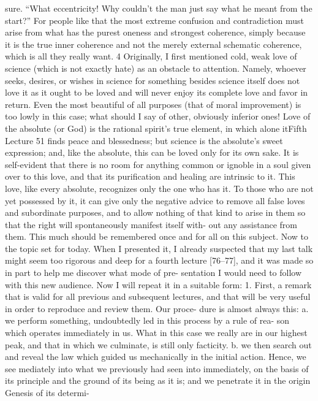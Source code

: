 sure. “What eccentricity! Why couldn’t the man just say what he meant from
the start?” For people like that the most extreme confusion and contradiction
must arise from what has the purest oneness and strongest coherence, simply
because it is the true inner coherence and not the merely external schematic
coherence, which is all they really want. 4
Originally, I first mentioned cold, weak love of science (which is not
exactly hate) as an obstacle to attention. Namely, whoever seeks, desires, or
wishes in science for something besides science itself does not love it as it
ought to be loved and will never enjoy its complete love and favor in return.
Even the most beautiful of all purposes (that of moral improvement) is too
lowly in this case; what should I say of other, obviously inferior ones! Love of
the absolute (or God) is the rational spirit’s true element, in which alone itFifth Lecture
51
finds peace and blessedness; but science is the absolute’s sweet expression; and,
like the absolute, this can be loved only for its own sake. It is self-evident that
there is no room for anything common or ignoble in a soul given over to this
love, and that its purification and healing are intrinsic to it.
This love, like every absolute, recognizes only the one who has it. To
those who are not yet possessed by it, it can give only the negative advice to
remove all false loves and subordinate purposes, and to allow nothing of that
kind to arise in them so that the right will spontaneously manifest itself with-
out any assistance from them. This much should be remembered once and for
all on this subject.
Now to the topic set for today. When I presented it, I already suspected
that my last talk might seem too rigorous and deep for a fourth lecture
[76–77], and it was made so in part to help me discover what mode of pre-
sentation I would need to follow with this new audience. Now I will repeat it
in a suitable form:
1. First, a remark that is valid for all previous and subsequent lectures, and
that will be very useful in order to reproduce and review them. Our proce-
dure is almost always this:
a. we perform something, undoubtedly led in this process by a rule of rea-
son which operates immediately in us. What in this case we really are in
our highest peak, and that in which we culminate, is still only facticity.
b. we then search out and reveal the law which guided us mechanically in
the initial action. Hence, we see mediately into what we previously had
seen into immediately, on the basis of its principle and the ground of its
being as it is; and we penetrate it in the origin {Genesis} of its determi-
